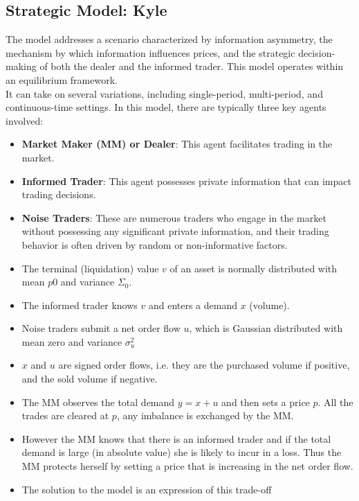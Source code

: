 \subsection{Strategic Model: Kyle}
The model addresses a scenario characterized by information asymmetry, the mechanism by which information influences prices, and the strategic decision-making of both the dealer and the informed trader. This model operates within an equilibrium framework.\\
It can take on several variations, including single-period, multi-period, and continuous-time settings. In this model, there are typically three key agents involved:
\begin{itemize}
	\item \textbf{Market Maker (MM) or Dealer}: This agent facilitates trading in the market.
	
	\item \textbf{Informed Trader}: This agent possesses private information that can impact trading decisions.
	
	\item \textbf{Noise Traders}: These are numerous traders who engage in the market without possessing any significant private information, and their trading behavior is often driven by random or non-informative factors.
\end{itemize}
\begin{mysetting}
	\begin{itemize}
		\item The terminal (liquidation) value $v$ of an asset is normally distributed with mean $p0$ and variance $\Sigma_0$.
		\item The informed trader knows $v$ and enters a demand $x$ (volume).
		\item Noise traders submit a net order flow $u$, which is Gaussian distributed with mean zero and variance $\sigma_u^2$
	\end{itemize}
\end{mysetting}
\begin{mysetting}
		\begin{itemize}
			\item $x$ and $u$ are signed order flows, i.e. they are the purchased volume if positive, and
			the sold volume if negative.
			\item The MM observes the total demand $y = x + u$ and then sets a price $p$. All the trades are cleared at $p$, any imbalance is exchanged by the MM.   
			\item  However the MM knows that there is an informed trader and if the total demand is
			large (in absolute value) she is likely to incur in a loss. Thus the MM protects
			herself by setting a price that is increasing in the net order flow.
			\item The solution to the model is an expression of this trade-off
    \end{itemize}
\end{mysetting}
